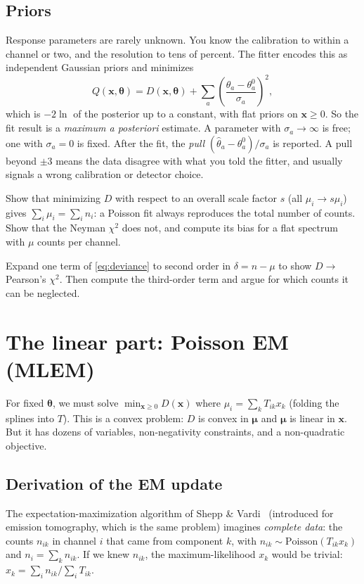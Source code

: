 \documentclass[11pt]{article}
\newcounter{exercise}[section]
\newcommand{\vth}{\bm{\theta}}
\newcommand{\vx}{\bm{x}}
\newcommand{\vmu}{\bm{\mu}}
\begin{document}
\subsection{Priors}
Response parameters are rarely unknown. You know the calibration to within a channel or two, and the resolution to tens of percent. The fitter encodes this as independent Gaussian priors and minimizes
\begin{equation}
Q(\vx,\vth) = D(\vx,\vth) + \sum_a \left(\frac{\theta_a-\theta_a^0}{\sigma_a}\right)^2, \label{eq:objective}
\end{equation}
which is $-2\ln$ of the posterior up to a constant, with flat priors on $\vx\ge0$. So the fit result is a \emph{maximum a posteriori} estimate. A parameter with $\sigma_a\to\infty$ is free; one with $\sigma_a = 0$ is fixed. After the fit, the \emph{pull} $(\hat\theta_a-\theta_a^0)/\sigma_a$ is reported. A pull beyond $\pm3$ means the data disagree with what you told the fitter, and usually signals a wrong calibration or detector choice.

\begin{exercise}[A]
Show that minimizing $D$ with respect to an overall scale factor $s$ (all $\mu_i \to s\mu_i$) gives $\sum_i\mu_i = \sum_i n_i$: a Poisson fit always reproduces the total number of counts. Show that the Neyman $\chi^2$ does not, and compute its bias for a flat spectrum with $\mu$ counts per channel.
\end{exercise}

\begin{exercise}[A]
Expand one term of \cref{eq:deviance} to second order in $\delta = n-\mu$ to show $D\to$ Pearson's $\chi^2$. Then compute the third-order term and argue for which counts it can be neglected.
\end{exercise}

\section{The linear part: Poisson EM (MLEM)}\label{sec:mlem}
For fixed $\vth$, we must solve $\min_{\vx\ge0} D(\vx)$ where $\mu_i = \sum_k T_{ik}x_k$ (folding the splines into $T$). This is a convex problem: $D$ is convex in $\vmu$ and $\vmu$ is linear in $\vx$. But it has dozens of variables, non-negativity constraints, and a non-quadratic objective.

\subsection{Derivation of the EM update}
The expectation-maximization algorithm of Shepp \& Vardi~\cite{SheppVardi} (introduced for emission tomography, which is the same problem) imagines \emph{complete data}: the counts $n_{ik}$ in channel $i$ that came from component $k$, with $n_{ik}\sim\mathrm{Poisson}(T_{ik}x_k)$ and $n_i = \sum_k n_{ik}$. If we knew $n_{ik}$, the maximum-likelihood $x_k$ would be trivial: $\hat x_k = \sum_i n_{ik}/\sum_i T_{ik}$.
\end{document}
